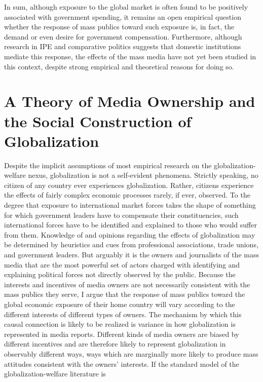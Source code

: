 \documentclass[12pt]{report}
\begin{document}
In sum, although exposure to the global market is often found to be positively associated with
government spending, it remains an open empirical question whether the response of mass publics
toward such exposure is, in fact, the demand or even desire for government compensation.
Furthermore, although research in IPE and comparative politics suggests that domestic
institutions mediate this response, the effects of the mass media have not yet been studied in
this context, despite strong empirical and theoretical reasons for doing so.

\section{A Theory of Media Ownership and the Social Construction of Globalization}

Despite the implicit assumptions of most empirical research on the globalization-welfare nexus,
globalization is not a self-evident phenomena. Strictly speaking, no citizen of any country ever
experiences globalization. Rather, citizens experience the effects of fairly complex economic
processes rarely, if ever, observed. To the degree that exposure to international market forces
takes the shape of something for which government leaders have to compensate their
constituencies, such international forces have to be identified and explained to those who would
suffer from them. Knowledge of and opinions regarding the effects of globalization may be
determined by heuristics and cues from professional associations, trade unions, and government
leaders. But arguably it is the owners and journalists of the mass media that are the most
powerful set of actors charged with identifying and explaining political forces not directly
observed by the public. Because the interests and incentives of media owners are not necessarily
consistent with the mass publics they serve, I argue that the response of mass publics toward
the global economic exposure of their home country will vary according to the different
interests of different types of owners. The mechanism by which this causal connection is likely to be realized is variance in how globalization is represented in media reports. Different kinds of media owners are biased by different incentives and are therefore likely to represent globalization in observably different ways, ways which are marginally more likely to produce mass attitudes consistent with the owners' interests. If the standard model of the
globalization-welfare literature is
\end{document}
